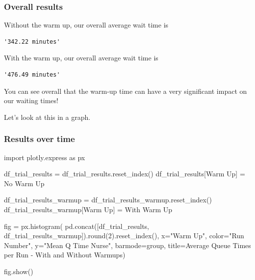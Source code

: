 \documentclass[
  letterpaper,
  DIV=11,
  numbers=noendperiod]{scrreprt}
\newenvironment{Shaded}{\begin{snugshade}}{\end{snugshade}}
\newcommand{\BuiltInTok}[1]{\textcolor[rgb]{0.00,0.23,0.31}{#1}}
\newcommand{\DecValTok}[1]{\textcolor[rgb]{0.68,0.00,0.00}{#1}}
\newcommand{\ImportTok}[1]{\textcolor[rgb]{0.00,0.46,0.62}{#1}}
\newcommand{\NormalTok}[1]{\textcolor[rgb]{0.00,0.23,0.31}{#1}}
\newcommand{\OperatorTok}[1]{\textcolor[rgb]{0.37,0.37,0.37}{#1}}
\newcommand{\StringTok}[1]{\textcolor[rgb]{0.13,0.47,0.30}{#1}}
\begin{document}
\subsubsection{Overall results}\label{overall-results}

Without the warm up, our overall average wait time is

\begin{verbatim}
'342.22 minutes'
\end{verbatim}

With the warm up, our overall average wait time is

\begin{verbatim}
'476.49 minutes'
\end{verbatim}

You can see overall that the warm-up time can have a very significant
impact on our waiting times!

Let's look at this in a graph.

\subsubsection{Results over time}\label{results-over-time}

\begin{Shaded}
\begin{Highlighting}[]
\ImportTok{import}\NormalTok{ plotly.express }\ImportTok{as}\NormalTok{ px}

\NormalTok{df\_trial\_results }\OperatorTok{=}\NormalTok{ df\_trial\_results.reset\_index()}
\NormalTok{df\_trial\_results[}\StringTok{\textquotesingle{}Warm Up\textquotesingle{}}\NormalTok{] }\OperatorTok{=} \StringTok{\textquotesingle{}No Warm Up\textquotesingle{}}

\NormalTok{df\_trial\_results\_warmup }\OperatorTok{=}\NormalTok{ df\_trial\_results\_warmup.reset\_index()}
\NormalTok{df\_trial\_results\_warmup[}\StringTok{\textquotesingle{}Warm Up\textquotesingle{}}\NormalTok{] }\OperatorTok{=} \StringTok{\textquotesingle{}With Warm Up\textquotesingle{}}

\NormalTok{fig }\OperatorTok{=}\NormalTok{ px.histogram(}
\NormalTok{    pd.concat([df\_trial\_results, df\_trial\_results\_warmup]).}\BuiltInTok{round}\NormalTok{(}\DecValTok{2}\NormalTok{).reset\_index(),}
\NormalTok{    x}\OperatorTok{=}\StringTok{"Warm Up"}\NormalTok{,}
\NormalTok{    color}\OperatorTok{=}\StringTok{"Run Number"}\NormalTok{, y}\OperatorTok{=}\StringTok{"Mean Q Time Nurse"}\NormalTok{,}
\NormalTok{    barmode}\OperatorTok{=}\StringTok{\textquotesingle{}group\textquotesingle{}}\NormalTok{,}
\NormalTok{    title}\OperatorTok{=}\StringTok{\textquotesingle{}Average Queue Times per Run {-} With and Without Warmups\textquotesingle{}}\NormalTok{)}

\NormalTok{fig.show()}
\end{Highlighting}
\end{Shaded}
\end{document}
